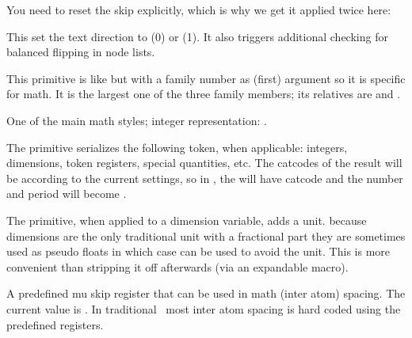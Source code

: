 \typebuffer

You need to reset the skip explicitly, which is why we get it applied twice here:

\blank {\showboxes \getbuffer} \blank

\stopoldprimitive

\startnewprimitive[title={\prm {textdirection}}]

This set the text direction to  (0) or  (1). It also
triggers additional checking for balanced flipping in node lists.

\stopnewprimitive

\startoldprimitive[title={\prm {textfont}}]

This primitive is like  but with a family number as (first) argument
so it is specific for math. It is the largest one of the three family members; its
relatives are  and .

\stopoldprimitive

\startoldprimitive[title={\prm {textstyle}}]

One of the main math styles; integer representation: \the\textstyle.

\stopoldprimitive

\startoldprimitive[title={\prm {the}}]

The  primitive serializes the following token, when applicable:
integers, dimensions, token registers, special quantities, etc. The catcodes of
the result will be according to the current settings, so in ,
the  will have catcode  and the number and period will
become .

\stopoldprimitive

\startnewprimitive[title={\prm {thewithoutunit}}]

The  primitive, when applied to a dimension variable, adds a 
unit. because dimensions are the only traditional unit with a fractional part
they are sometimes used as pseudo floats in which case  can
be used to avoid the unit. This is more convenient than stripping it off
afterwards (via an expandable macro).

\stopnewprimitive

\startoldprimitive[title={\prm {thickmuskip}}]

A predefined mu skip register that can be used in math (inter atom) spacing. The
current value is {\tt \the\thickmuskip}. In traditional \TEX\ most inter atom
spacing is hard coded using the predefined registers.

